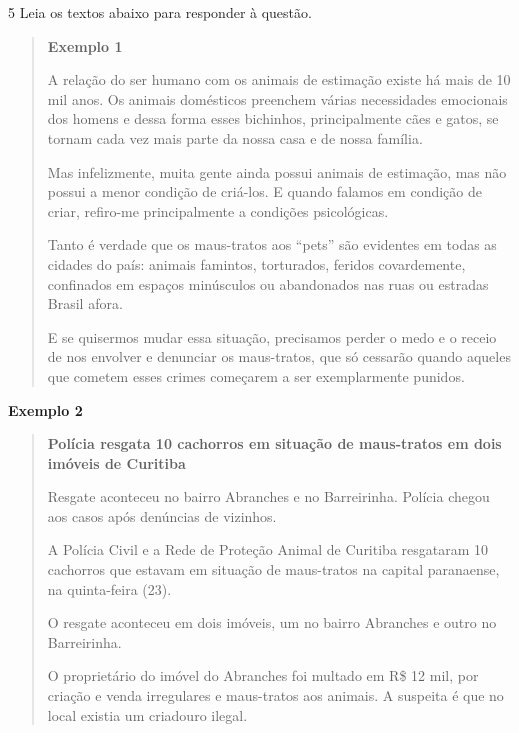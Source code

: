 \num{5} Leia os textos abaixo para responder à questão. 

\begin{quote}

\textbf{Exemplo 1}

A relação do ser humano com os animais de estimação existe há mais de 10
mil anos. Os animais domésticos preenchem várias necessidades emocionais
dos homens e dessa forma esses bichinhos, principalmente cães e gatos,
se tornam cada vez mais parte da nossa casa e de nossa família.

Mas infelizmente, muita gente ainda possui animais de estimação, mas não
possui a menor condição de criá-los. E quando falamos em condição de
criar, refiro-me principalmente a condições psicológicas.

Tanto é verdade que os maus-tratos aos ``pets'' são evidentes em todas as
cidades do país: animais famintos, torturados, feridos covardemente,
confinados em espaços minúsculos ou abandonados nas ruas ou estradas
Brasil afora.

E se quisermos mudar essa situação, precisamos perder o medo e o receio
de nos envolver e denunciar os maus-tratos, que só cessarão
quando aqueles que cometem esses crimes começarem a ser exemplarmente
punidos.

\end{quote}


\textbf{Exemplo 2}

\begin{quote}

\textbf{Polícia resgata 10 cachorros em situação de maus-tratos em dois
imóveis de Curitiba}

Resgate aconteceu no bairro Abranches e no Barreirinha. Polícia chegou
aos casos após denúncias de vizinhos.

A Polícia Civil e a Rede de Proteção Animal de Curitiba resgataram 10
cachorros que estavam em situação de maus-tratos na capital paranaense,
na quinta-feira (23).

O resgate aconteceu em dois imóveis, um no bairro Abranches e outro no
Barreirinha.

O proprietário do imóvel do Abranches foi multado em R\$ 12 mil, por
criação e venda irregulares e maus-tratos aos animais. A suspeita é que
no local existia um criadouro ilegal.

\end{quote}

